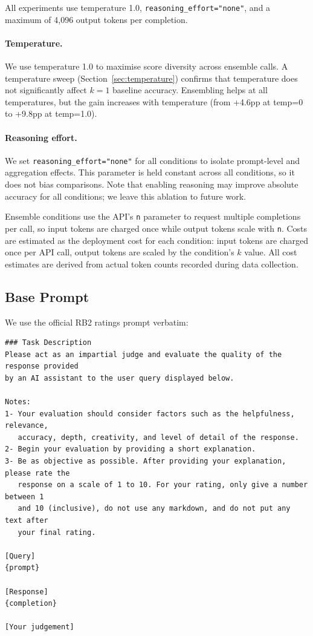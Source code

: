\documentclass{article}
\begin{document}
All experiments use temperature 1.0, \texttt{reasoning\_effort="none"}, and a maximum of 4,096 output tokens per completion.

\paragraph{Temperature.} We use temperature 1.0 to maximise score diversity across ensemble calls. A temperature sweep (Section~\ref{sec:temperature}) confirms that temperature does not significantly affect $k{=}1$ baseline accuracy. Ensembling helps at all temperatures, but the gain increases with temperature (from +4.6pp at temp=0 to +9.8pp at temp=1.0).

\paragraph{Reasoning effort.} We set \texttt{reasoning\_effort="none"} for all conditions to isolate prompt-level and aggregation effects. This parameter is held constant across all conditions, so it does not bias comparisons. Note that enabling reasoning may improve absolute accuracy for all conditions; we leave this ablation to future work.

Ensemble conditions use the API's \texttt{n} parameter to request multiple completions per call, so input tokens are charged once while output tokens scale with \texttt{n}. Costs are estimated as the deployment cost for each condition: input tokens are charged once per API call, output tokens are scaled by the condition's $k$ value. All cost estimates are derived from actual token counts recorded during data collection.

\subsection{Base Prompt}
\label{sec:base-prompt}

We use the official RB2 ratings prompt verbatim:

\begin{lstlisting}[style=prompt]
### Task Description
Please act as an impartial judge and evaluate the quality of the response provided
by an AI assistant to the user query displayed below.

Notes:
1- Your evaluation should consider factors such as the helpfulness, relevance,
   accuracy, depth, creativity, and level of detail of the response.
2- Begin your evaluation by providing a short explanation.
3- Be as objective as possible. After providing your explanation, please rate the
   response on a scale of 1 to 10. For your rating, only give a number between 1
   and 10 (inclusive), do not use any markdown, and do not put any text after
   your final rating.

[Query]
{prompt}

[Response]
{completion}

[Your judgement]
\end{lstlisting}
\end{document}
